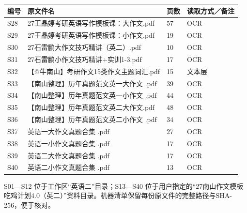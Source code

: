 \documentclass[11pt,a4paper,fontset=macnew]{ctexart}
\begin{document}
\clearpage\par\vspace{4pt}{\bfseries 原文件索引 28—40}\par\nopagebreak
{\small
\begin{longtable}{L{13mm}L{104mm}L{11mm}L{25mm}}\toprule
\textbf{编号} & \textbf{原文件名} & \textbf{页数} & \textbf{读取方式／备注}\\\midrule\endhead
S28 & 27王晶婷考研英语写作模板课：大作文.pdf & 57 & OCR\\
S29 & 27王晶婷考研英语写作模板课：小作文.pdf & 19 & OCR\\
S30 & 27石雷鹏大作文技巧精讲（英二）.pdf & 10 & OCR\\
S31 & 27石雷鹏小作文技巧精讲+实训1-3.pdf & 17 & OCR\\
S32 & 【@牛南山】考研作文15类作文主题词汇.pdf & 15 & 文本层\\
S33 & 【南山整理】历年真题范文英一大作文 .pdf & 39 & OCR\\
S34 & 【南山整理】历年真题范文英一小作文 .pdf & 44 & OCR\\
S35 & 【南山整理】历年真题范文英二大作文.pdf & 48 & OCR\\
S36 & 【南山整理】历年真题范文英二小作文 .pdf & 34 & OCR\\
S37 & 英语一大作文真题合集 .pdf & 27 & OCR\\
S38 & 英语一小作文真题合集 .pdf & 17 & OCR\\
S39 & 英语二大作文真题合集 .pdf & 17 & OCR\\
S40 & 英语二小作文真题合集 .pdf & 13 & OCR\\
\bottomrule\end{longtable}
}
S01—S12 位于工作区“英语二”目录；S13—S40 位于用户指定的“27南山作文模板吃鸡计划4.0（英二）”资料目录。机器清单保留每份原文件的完整路径与SHA-256，便于核对。
\end{document}
